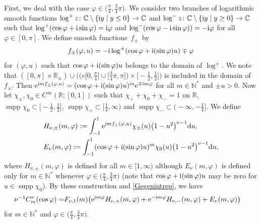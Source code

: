 \documentclass[pdftex]{sigma}
\numberwithin{equation}{section}
\def\R{\mathbb{R}}%
\DeclareMathOperator{\supp}{supp}%
\def\f{\varphi}
\def\n{\nu}
\begin{document}
First, we deal with the case $\f\in \bigl(\frac{\pi}{4}, \frac{3}{4}\pi\bigr)$.
We consider two branches of logarithmic smooth functions $\log^+z\colon\mathbb{C}\setminus \{{\rm i}y\mid y\leq 0\}\to \mathbb{C}$ and $\log^-z\colon\mathbb{C}\setminus \{{\rm i}y\mid y\geq 0\}\to \mathbb{C}$ such that $\log^+(\cos \f+{\rm i}\sin \f)={\rm i}\f$ and $\log^-(\cos\f-{\rm i}\sin\f))=-{\rm i}\f$ for all $\f\in [0,\pi]$. We define smooth functions~$f_{\pm}$~by
\begin{align*}
f_{\pm}(\f,u)=-{\rm i}\log^{\pm}(\cos\f+{\rm i}(\sin\f)u)\mp \f
\end{align*}
for $(\f,u)$ such that $\cos\f+{\rm i}(\sin\f)u$ belongs to the domain of $\log^{\pm}$. We note that
$([0,\pi]\times \R_{\pm})\cup \bigl(\bigl(v[0,\frac{\pi}{4}\bigr]\cup \bigl[\frac{3}{4}\pi,\pi\bigr]\bigr)\times \bigl[-\frac{1}{2},\frac{1}{2}\bigr] \bigr)$ is included in the domain of $f_{\pm}$.
Then ${\rm e}^{{\rm i}mf_{\pm}(\f,u)}=(\cos\f+{\rm i}(\sin\f)u)^m{\rm e}^{\mp {\rm i}m\f}$ for all $m\in\mathbb{N}^*$ and $\pm u>0$.
Now let $\chi_{\pm},\chi_0\in C^{\infty}(\R;[0,1])$ such that $\chi_++\chi_0+\chi_-=1$ on $\R$, $\supp\chi_0\subset \bigl[-\frac{1}{2},\frac{1}{2}\bigr]$, $\supp \chi_+\subset \bigl[\frac{1}{4},\infty\bigr)$ and $\supp\chi_-\subset \bigl(-\infty,-\frac{1}{4}\bigr]$. We define
\begin{align*}
&H_{\n,\pm}(m,\f):=\int_{-1}^1{\rm e}^{{\rm i}mf_{\pm}(\f,u)}\chi_{\pm}(u)\bigl(1-u^2\bigr)^{\n-1}{\rm d}u,\\
&E_{\n}(m,\f):=\int_{-1}^1(\cos \f+{\rm i}(\sin\f)u)^m\chi_{0}(u)\bigl(1-u^2\bigr)^{\n-1}{\rm d}u,
\end{align*}
where $H_{\n,\pm}(m,\f)$ is defined for all $m\in [1,\infty)$ although $E_{\n}(m,\f)$ is defined only for $m\in \mathbb{N}^*$ whenever $\f\in \bigl(\frac{\pi}{4}, \frac{3}{4}\pi\bigr)$ (note that $\cos\f+{\rm i}(\sin \f)u$ may be zero for $u\in \supp \chi_0$). By these construction and \eqref{Gegenintrep}, we have
\begin{align}\label{Gegendecom}
\n^{-1}C_m^{\n}(\cos\f)=&F_{\n,1}(m)\bigl({\rm e}^{{\rm i}m\f}H_{\n,+}(m,\f)+{\rm e}^{-{\rm i}m\f}H_{\n,-}(m,\f)+E_{\n}(m,\f) \bigr)
\end{align}
for $m\in\mathbb{N}^*$ and $\f\in \bigl(\frac{\pi}{4}, \frac{3}{4}\pi\bigr)$.
\end{document}
